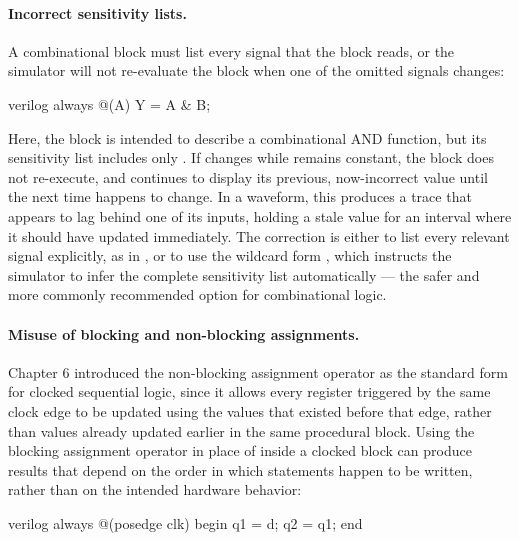 \paragraph{Incorrect sensitivity lists.} A combinational  block must list every signal that the block reads, or the simulator will not re-evaluate the block when one of the omitted signals changes:

\begin{codeblock}{verilog}
always @(A)
    Y = A & B;
\end{codeblock}

Here, the block is intended to describe a combinational AND function, but its sensitivity list includes only . If  changes while  remains constant, the block does not re-execute, and  continues to display its previous, now-incorrect value until the next time  happens to change. In a waveform, this produces a  trace that appears to lag behind one of its inputs, holding a stale value for an interval where it should have updated immediately. The correction is either to list every relevant signal explicitly, as in , or to use the wildcard form , which instructs the simulator to infer the complete sensitivity list automatically --- the safer and more commonly recommended option for combinational logic.\\

\paragraph{Misuse of blocking and non-blocking assignments.} Chapter 6 introduced the non-blocking assignment operator \inlinecode{<=} as the standard form for clocked sequential logic, since it allows every register triggered by the same clock edge to be updated using the values that existed before that edge, rather than values already updated earlier in the same procedural block. Using the blocking assignment operator \inlinecode{=} in place of \inlinecode{<=} inside a clocked block can produce results that depend on the order in which statements happen to be written, rather than on the intended hardware behavior:

\begin{codeblock}{verilog}
always @(posedge clk) begin
    q1 = d;
    q2 = q1;
end
\end{codeblock}

